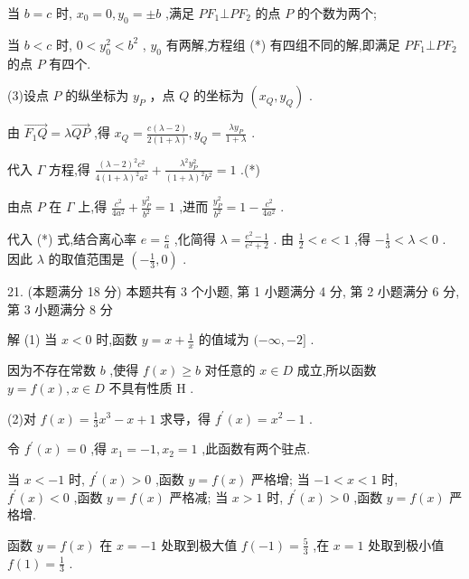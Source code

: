\documentclass[10pt]{article}
\begin{document}
当 \(b = c\) 时, \({x}_{0} = 0,{y}_{0} =  \pm  b\) ,满足 \(P{F}_{1} \bot  P{F}_{2}\) 的点 \(P\) 的个数为两个;

当 \(b < c\) 时, \(0 < {y}_{0}^{2} < {b}^{2}\) , \({y}_{0}\) 有两解,方程组 (*) 有四组不同的解,即满足 \(P{F}_{1} \bot  P{F}_{2}\) 的点 \(P\) 有四个.

(3)设点 \(P\) 的纵坐标为 \({y}_{P}\) ，点 \(Q\) 的坐标为 \(\left( {{x}_{Q},{y}_{Q}}\right)\) .

由 \(\overrightarrow{{F}_{1}Q} = \lambda \overrightarrow{QP}\) ,得 \({x}_{Q} = \frac{c\left( {\lambda  - 2}\right) }{2\left( {1 + \lambda }\right) },{y}_{Q} = \frac{\lambda {y}_{P}}{1 + \lambda }\) .

代入 \(\Gamma\) 方程,得 \(\frac{{\left( \lambda  - 2\right) }^{2}{c}^{2}}{4{\left( 1 + \lambda \right) }^{2}{a}^{2}} + \frac{{\lambda }^{2}{y}_{P}^{2}}{{\left( 1 + \lambda \right) }^{2}{b}^{2}} = 1\) .(*)

由点 \(P\) 在 \(\Gamma\) 上,得 \(\frac{{c}^{2}}{4{a}^{2}} + \frac{{y}_{P}^{2}}{{b}^{2}} = 1\) ,进而 \(\frac{{y}_{P}^{2}}{{b}^{2}} = 1 - \frac{{c}^{2}}{4{a}^{2}}\) .

代入 (*) 式,结合离心率 \(e = \frac{c}{a}\) ,化简得 \(\lambda  = \frac{{e}^{2} - 1}{{e}^{2} + 2}\) . 由 \(\frac{1}{2} < e < 1\) ,得 \(- \frac{1}{3} < \lambda  < 0\) . 因此 \(\lambda\) 的取值范围是 \(\left( {-\frac{1}{3},0}\right)\) .

21. (本题满分 18 分) 本题共有 3 个小题, 第 1 小题满分 4 分, 第 2 小题满分 6 分, 第 3 小题满分 8 分

解 (1) 当 \(x < 0\) 时,函数 \(y = x + \frac{1}{x}\) 的值域为 \(( - \infty , - 2\rbrack\) .

因为不存在常数 \(b\) ,使得 \(f\left( x\right)  \geq  b\) 对任意的 \(x \in  D\) 成立,所以函数 \(y = f\left( x\right) ,x \in  D\) 不具有性质 \(\mathrm{H}\) .

(2)对 \(f\left( x\right)  = \frac{1}{3}{x}^{3} - x + 1\) 求导，得 \({f}^{\prime }\left( x\right)  = {x}^{2} - 1\) .

令 \({f}^{\prime }\left( x\right)  = 0\) ,得 \({x}_{1} =  - 1,{x}_{2} = 1\) ,此函数有两个驻点.

当 \(x <  - 1\) 时, \({f}^{\prime }\left( x\right)  > 0\) ,函数 \(y = f\left( x\right)\) 严格增; 当 \(- 1 < x < 1\) 时, \({f}^{\prime }\left( x\right)  < 0\) ,函数 \(y = f\left( x\right)\) 严格减; 当 \(x > 1\) 时, \({f}^{\prime }\left( x\right)  > 0\) ,函数 \(y = f\left( x\right)\) 严格增.

函数 \(y = f\left( x\right)\) 在 \(x =  - 1\) 处取到极大值 \(f\left( {-1}\right)  = \frac{5}{3}\) ,在 \(x = 1\) 处取到极小值 \(f\left( 1\right)  = \frac{1}{3}\) .
\end{document}
